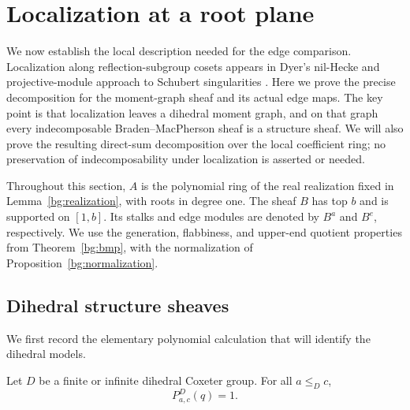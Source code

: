 \section{Localization at a root plane}
\label{sec:localization}

We now establish the local description needed for the edge comparison.
Localization along reflection-subgroup cosets appears in Dyer's nil-Hecke
and projective-module approach to Schubert singularities
\cite[Sections~1.7--1.9 and~3.16]{DyerRankTwo}. Here we prove the
precise decomposition for the moment-graph sheaf and its actual edge maps.
The key point is that localization leaves a dihedral moment graph, and on
that graph every indecomposable Braden--MacPherson sheaf is a structure
sheaf.  We will also prove the resulting direct-sum decomposition over the
local coefficient ring; no preservation of indecomposability under
localization is asserted or needed.

Throughout this section, $A$ is the polynomial ring of the real
realization fixed in Lemma~\ref{bg:realization}, with roots in degree
one.  The sheaf $B$ has top $b$ and is supported on $[1,b]$.
Its stalks and edge modules are denoted by $B^a$ and $B^e$, respectively.
We use the generation, flabbiness, and upper-end quotient properties from
Theorem~\ref{bg:bmp}, with the normalization of
Proposition~\ref{bg:normalization}.

\subsection{Dihedral structure sheaves}

We first record the elementary polynomial calculation that will identify
the dihedral models.

\begin{lemma}
\label{loc:dihedral-kl}
Let $D$ be a finite or infinite dihedral Coxeter group.  For all $a\le_D c$,
\[
  P^D_{a,c}(q)=1.
\]
\end{lemma}

